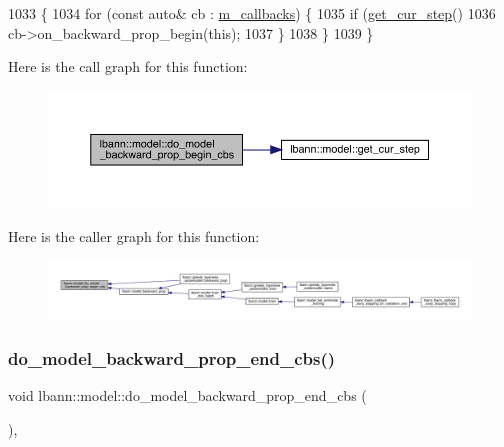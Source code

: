 \begin{DoxyCode}
1033                                              \{
1034   \textcolor{keywordflow}{for} (\textcolor{keyword}{const} \textcolor{keyword}{auto}& cb : \hyperlink{classlbann_1_1model_a07b511fef30368494c2ad80922ffd0eb}{m\_callbacks}) \{
1035     \textcolor{keywordflow}{if} (\hyperlink{classlbann_1_1model_ad0cdcba177434b52dc9c4a97be183a92}{get\_cur\_step}() %
1036       cb->on\_backward\_prop\_begin(\textcolor{keyword}{this});
1037     \}
1038   \}
1039 \}
\end{DoxyCode}
Here is the call graph for this function\+:\nopagebreak
\begin{figure}[H]
\begin{center}
\leavevmode
\includegraphics[width=350pt]{classlbann_1_1model_a8a60eee343381e657b2c042637e56751_cgraph}
\end{center}
\end{figure}
Here is the caller graph for this function\+:\nopagebreak
\begin{figure}[H]
\begin{center}
\leavevmode
\includegraphics[width=350pt]{classlbann_1_1model_a8a60eee343381e657b2c042637e56751_icgraph}
\end{center}
\end{figure}
\mbox{\label{classlbann_1_1model_a737a0129eadf52be476034888b3eedc2}} 
\subsubsection{\texorpdfstring{do\+\_\+model\+\_\+backward\+\_\+prop\+\_\+end\+\_\+cbs()}{do\_model\_backward\_prop\_end\_cbs()}}
{\footnotesize\ttfamily void lbann\+::model\+::do\+\_\+model\+\_\+backward\+\_\+prop\+\_\+end\+\_\+cbs (\begin{DoxyParamCaption}{ }\end{DoxyParamCaption})\hspace{0.3cm}{\ttfamily [protected]}, {\ttfamily [virtual]}}

